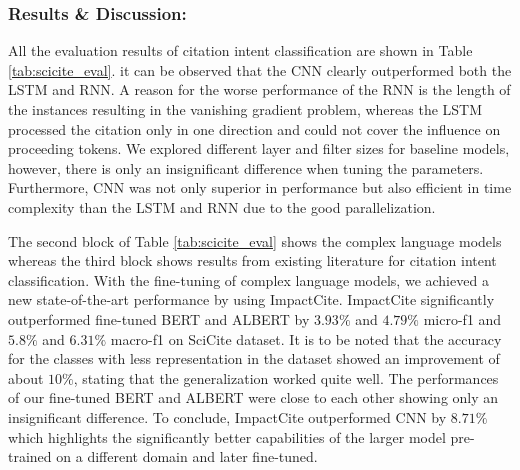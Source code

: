\documentclass[runningheads]{llncs}
\begin{document}
\subsubsection{Results \& Discussion:}
All the evaluation results of citation intent classification are shown in Table \ref{tab:scicite_eval}. it can be observed that the CNN clearly outperformed both the LSTM and RNN. A reason for the worse performance of the RNN is the length of the instances resulting in the vanishing gradient problem, whereas the LSTM processed the citation only in one direction and could not cover the influence on proceeding tokens. We explored different layer and filter sizes for baseline models, however, there is only an insignificant difference when tuning the parameters. Furthermore, CNN was not only superior in performance but also efficient in time complexity than the LSTM and RNN due to the good parallelization. 

The second block of Table \ref{tab:scicite_eval} shows the complex language models whereas the third block shows results from existing literature for citation intent classification. With the fine-tuning of complex language models, we achieved a new state-of-the-art performance by using ImpactCite. ImpactCite significantly outperformed fine-tuned BERT and ALBERT by $3.93\%$ and $4.79\%$ micro-f1 and $5.8\%$ and $6.31\%$ macro-f1 on SciCite dataset. It is to be noted that the accuracy for the classes with less representation in the dataset showed an improvement of about $10\%$, stating that the generalization worked quite well. The performances of our fine-tuned BERT and ALBERT were close to each other showing only an insignificant difference. To conclude, ImpactCite outperformed CNN by $8.71\%$ which highlights the significantly better capabilities of the larger model pre-trained on a different domain and later fine-tuned.
\end{document}
